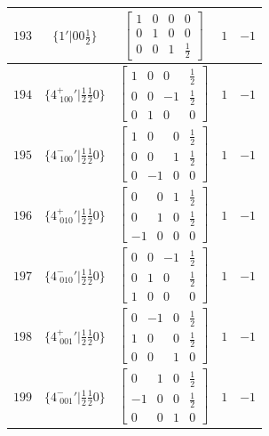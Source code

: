 \documentclass[fleqn,8pt]{jsarticle}
\begin{document}
\begin{longtable}{ccccc}
$ 193 $ & $ \{1{}'|0 0 \frac{1}{2}\} $ & $ \begin{bmatrix} 1 & 0 & 0 & 0 \\ 0 & 1 & 0 & 0 \\ 0 & 0 & 1 & \frac{1}{2} \end{bmatrix} $ & $ 1 $ & $ -1 $ \\ \hline
$ 194 $ & $ \{4^{+}_{\,\,100}{}'|\frac{1}{2} \frac{1}{2} 0\} $ & $ \begin{bmatrix} 1 & 0 & 0 & \frac{1}{2} \\ 0 & 0 & -1 & \frac{1}{2} \\ 0 & 1 & 0 & 0 \end{bmatrix} $ & $ 1 $ & $ -1 $ \\ \hline
$ 195 $ & $ \{4^{-}_{\,\,100}{}'|\frac{1}{2} \frac{1}{2} 0\} $ & $ \begin{bmatrix} 1 & 0 & 0 & \frac{1}{2} \\ 0 & 0 & 1 & \frac{1}{2} \\ 0 & -1 & 0 & 0 \end{bmatrix} $ & $ 1 $ & $ -1 $ \\ \hline
$ 196 $ & $ \{4^{+}_{\,\,010}{}'|\frac{1}{2} \frac{1}{2} 0\} $ & $ \begin{bmatrix} 0 & 0 & 1 & \frac{1}{2} \\ 0 & 1 & 0 & \frac{1}{2} \\ -1 & 0 & 0 & 0 \end{bmatrix} $ & $ 1 $ & $ -1 $ \\ \hline
$ 197 $ & $ \{4^{-}_{\,\,010}{}'|\frac{1}{2} \frac{1}{2} 0\} $ & $ \begin{bmatrix} 0 & 0 & -1 & \frac{1}{2} \\ 0 & 1 & 0 & \frac{1}{2} \\ 1 & 0 & 0 & 0 \end{bmatrix} $ & $ 1 $ & $ -1 $ \\ \hline
$ 198 $ & $ \{4^{+}_{\,\,001}{}'|\frac{1}{2} \frac{1}{2} 0\} $ & $ \begin{bmatrix} 0 & -1 & 0 & \frac{1}{2} \\ 1 & 0 & 0 & \frac{1}{2} \\ 0 & 0 & 1 & 0 \end{bmatrix} $ & $ 1 $ & $ -1 $ \\ \hline
$ 199 $ & $ \{4^{-}_{\,\,001}{}'|\frac{1}{2} \frac{1}{2} 0\} $ & $ \begin{bmatrix} 0 & 1 & 0 & \frac{1}{2} \\ -1 & 0 & 0 & \frac{1}{2} \\ 0 & 0 & 1 & 0 \end{bmatrix} $ & $ 1 $ & $ -1 $ \\ \hline

\end{longtable}
\end{document}
